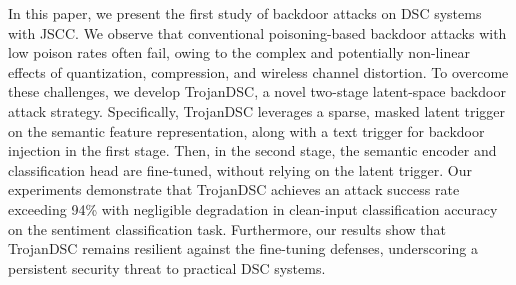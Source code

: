 \documentclass[journal]{IEEEtran}
\begin{document}
In this paper, we present the first study of backdoor attacks on DSC systems with JSCC. We observe that conventional poisoning-based backdoor attacks with low poison rates often fail, owing to the complex and potentially non-linear effects of quantization, compression, and wireless channel distortion. To overcome these challenges, we develop TrojanDSC, a novel two-stage latent-space backdoor attack strategy. Specifically, TrojanDSC leverages a sparse, masked latent trigger on the semantic feature representation, along with a text trigger for backdoor injection in the first stage. 
Then, in the second stage, the semantic encoder and classification head are fine-tuned, without relying on the latent trigger.
Our experiments demonstrate that TrojanDSC achieves an attack success rate exceeding 94\%  with negligible degradation in clean-input classification accuracy on the sentiment classification task. 
Furthermore, our results show that TrojanDSC remains resilient against the fine-tuning defenses, underscoring a persistent security threat to practical DSC systems.


\end{document}
